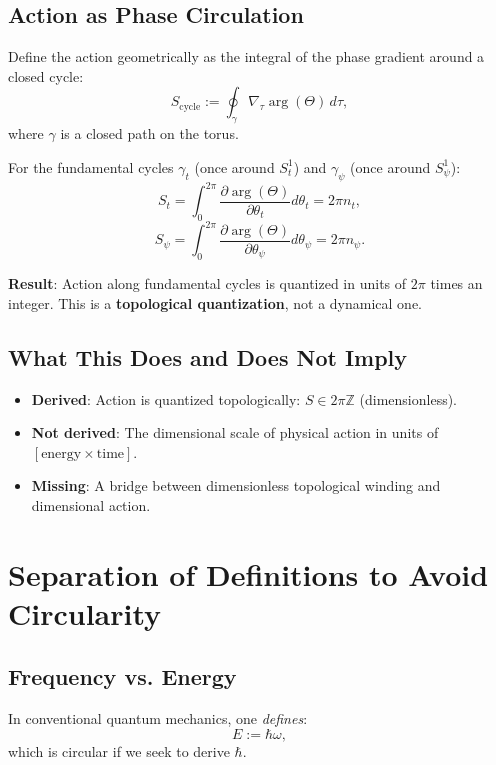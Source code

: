 \documentclass[12pt]{article}
\begin{document}
\subsection{Action as Phase Circulation}

Define the action geometrically as the integral of the phase gradient around a closed cycle:
\[
S_{\text{cycle}} := \oint_{\gamma} \nabla_\tau \arg(\Theta) \, d\tau,
\]
where $\gamma$ is a closed path on the torus.

For the fundamental cycles $\gamma_t$ (once around $S^1_t$) and $\gamma_\psi$ (once around $S^1_\psi$):
\[
S_t = \int_0^{2\pi} \frac{\partial \arg(\Theta)}{\partial \theta_t} d\theta_t = 2\pi n_t,
\]
\[
S_\psi = \int_0^{2\pi} \frac{\partial \arg(\Theta)}{\partial \theta_\psi} d\theta_\psi = 2\pi n_\psi.
\]

\textbf{Result}: Action along fundamental cycles is quantized in units of $2\pi$ times an integer. This is a \textbf{topological quantization}, not a dynamical one.

\subsection{What This Does and Does Not Imply}

\begin{itemize}
\item \textbf{Derived}: Action is quantized topologically: $S \in 2\pi \mathbb{Z}$ (dimensionless).
\item \textbf{Not derived}: The dimensional scale of physical action in units of $[\text{energy} \times \text{time}]$.
\item \textbf{Missing}: A bridge between dimensionless topological winding and dimensional action.
\end{itemize}

\section{Separation of Definitions to Avoid Circularity}

\subsection{Frequency vs. Energy}

In conventional quantum mechanics, one \emph{defines}:
\[
E := \hbar \omega,
\]
which is circular if we seek to derive $\hbar$.
\end{document}
